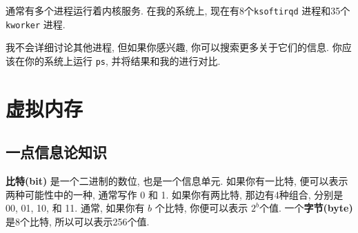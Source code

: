 \documentclass[12pt]{book}
\begin{document}
{%
通常有多个进程运行着内核服务.
在我的系统上, 现在有8个{\tt ksoftirqd} 进程和35个{\tt kworker} 进程.

我不会详细讨论其他进程, 但如果你感兴趣, 
你可以搜索更多关于它们的信息.
你应该在你的系统上运行 {\tt ps}, 并将结果和我的进行对比.


%
\chapter{虚拟内存}

\section{一点信息论知识}

%

{\bf 比特(bit)} 是一个二进制的数位, 也是一个信息单元.
如果你有一比特, 便可以表示两种可能性中的一种, 通常写作 0 和 1.
如果你有两比特, 那边有4种组合, 分别是 00, 01, 10, 和 11.
通常, 如果你有 $b$ 个比特, 你便可以表示 $2^b$个值.
一个{\bf 字节(byte)} 是8个比特, 所以可以表示256个值.

}
\end{document}
